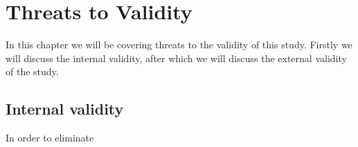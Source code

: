 \chapter{Threats to Validity}

In this chapter we will be covering threats to the validity of this study. Firstly we will discuss the internal validity, after which we will discuss the external validity of the study.

\section{Internal validity}
In order to eliminate 